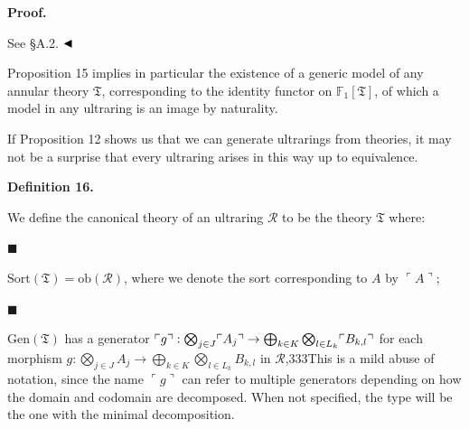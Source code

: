 \documentclass[10pt,a4paper]{amsart}
\begin{document}
 
 
\par\medskip\noindent\textbf{Proof.}\par
 
 
See §A.2. $\hfill\blacktriangleleft$\par
 
 
 
Proposition 15 implies in particular the existence of a generic model of any annular theory $\mathfrak{T}$, corresponding to the identity functor on $\mathbb{F}_{1}[\mathfrak{T}]$, of which a model in any ultraring is an image by naturality.\par
 
 
 
If Proposition 12 shows us that we can generate ultrarings from theories, it may not be a surprise that every ultraring arises in this way up to equivalence.\par
 
 
 
\par\medskip\noindent\textbf{Definition 16.}\par
 
 
We define the canonical theory of an ultraring $\mathcal{R}$ to be the theory $\mathfrak{T}$ where:\par
  
\par\noindent  $\blacksquare$ 
 
$\mathrm{Sort}(\mathfrak{T})=\mathrm{ob}(\mathcal{R})$, where we denote the sort corresponding to $A$ by $\ulcorner A\urcorner$;\par
 
 
 
\par\noindent  $\blacksquare$ 
 
$\mathrm{Gen}(\mathfrak{T})$ has a generator $\ulcorner g\urcorner:\bigotimes_{j\in J}\ulcorner A_{j}\urcorner\to\bigoplus_{%
k\in K}\bigotimes_{l\in L_{k}}\ulcorner B_{k,l}\urcorner$ for each morphism $g:\bigotimes_{j\in J}A_{j}\to\bigoplus_{k\in K}\bigotimes_{l\in L_{k}}B_{k,l}$ in $\mathcal{R}$,333This is a mild abuse of notation, since the name $\ulcorner g\urcorner$ can refer to multiple generators depending on how the domain and codomain are decomposed. When not specified, the type will be the one with the minimal decomposition.\par
 
\end{document}
